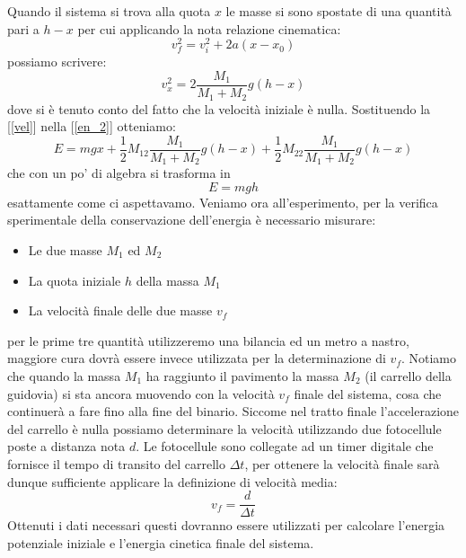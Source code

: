 \documentclass[a4paper,10pt,oneside]{article}
\begin{document}
Quando il sistema si trova alla quota $x$ le masse si sono spostate di una quantità pari a $h-x$ per cui applicando la nota relazione cinematica:
\begin{equation}
 v_f^2=v_i^2+2a(x-x_0)
\end{equation}
possiamo scrivere:
\begin{equation}\label{vel}
 v_x^2=2\frac{M_1}{M_1+M_2}g(h-x)
\end{equation}
dove si è tenuto conto del fatto che la velocità iniziale è nulla.
Sostituendo  la [\ref{vel}] nella  [\ref{en_2}] otteniamo:
\begin{equation}
 E=mgx+\frac{1}{2}M_12\frac{M_1}{M_1+M_2}g(h-x)+\frac{1}{2}M_22\frac{M_1}{M_1+M_2}g(h-x)
\end{equation}
che con un po' di algebra si trasforma in
\begin{equation}
 E=mgh
\end{equation}
esattamente come ci aspettavamo. Veniamo ora all'esperimento, per la verifica sperimentale della conservazione dell'energia è necessario misurare:
\begin{itemize}
 \item Le due masse $M_1$ ed $M_2$
\item La quota iniziale $h$ della massa $M_1$
\item La velocità finale delle due masse $v_f$
\end{itemize}
per le prime tre quantità utilizzeremo una bilancia ed un metro a nastro, maggiore cura dovrà essere invece utilizzata per la determinazione di $v_f$. Notiamo che quando la massa $M_1$ ha raggiunto il pavimento la massa $M_2$ (il carrello della guidovia) si sta ancora muovendo con la velocità $v_f$ finale del sistema, cosa che continuerà a fare fino alla fine del binario. Siccome nel tratto finale l'accelerazione del carrello è nulla possiamo determinare la velocità utilizzando due fotocellule poste a distanza nota $d$. Le fotocellule sono collegate ad un timer digitale che fornisce il tempo di transito del carrello $\Delta t$, per ottenere la velocità finale sarà dunque sufficiente applicare la definizione di velocità media:
\begin{equation}
 v_f=\frac{d}{\Delta t}
\end{equation}
Ottenuti i dati necessari questi dovranno essere utilizzati per calcolare l'energia potenziale iniziale e l'energia cinetica finale del sistema.


 
\end{document}
